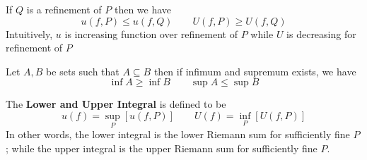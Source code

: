 \documentclass[11pt]{article}
\begin{document}
\begin{proposition*}
  If $Q$ is a refinement of $P$ then we have
  \[
    u(f, P) \leq u(f, Q) \quad \quad U(f, P) \geq U(f,Q)
  \]
  Intuitively, $u$ is increasing function over refinement of $P$ while $U$ is decreasing for refinement of $P$
\end{proposition*}

\begin{lemma*}
  Let $A,B$ be sets such that $A \subseteq B$ then if infimum and supremum exists, we have
  \[
    \inf A \geq \inf B \quad \quad \sup A \leq \sup B
  \]
\end{lemma*}

\begin{defn*}
  The \textbf{Lower and Upper Integral} is defined to be
  \[
    u(f) = \underset{P}{\sup} [u(f,P)] \quad\quad U(f) = \underset{P}{\inf} [U(f, P)]
  \]
  In other words, the lower integral is the lower Riemann sum for sufficiently fine $P$; while the upper integral is the upper Riemann sum for sufficiently fine $P$.
\end{defn*}
\end{document}
